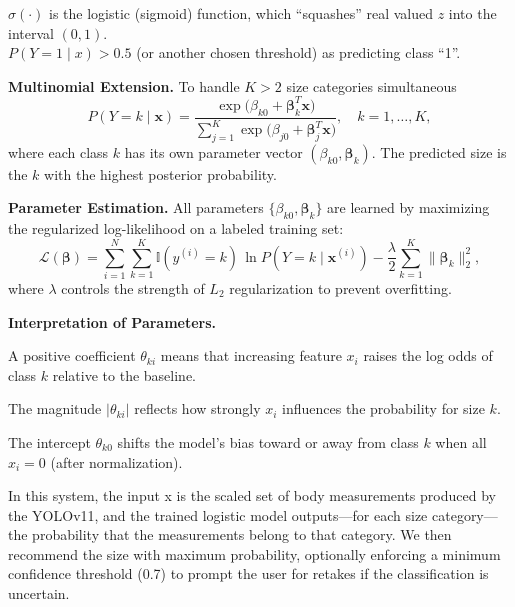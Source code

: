 \documentclass{llncs}
\begin{document}
$\sigma(\cdot)$ is the logistic (sigmoid) function, which ``squashes'' real valued $z$ into the interval $(0,1)$. \\

$P(Y = 1 \mid x) > 0.5$ (or another chosen threshold) as predicting class ``1''.


\textbf{Multinomial Extension.} To handle $K>2$ size categories simultaneous
\begin{equation}
P(Y=k \mid \mathbf{x}) = \frac{\exp\big(\beta_{k0} + \boldsymbol{\beta}_{k}^{T}\mathbf{x}\big)}{\displaystyle\sum_{j=1}^{K}\exp\big(\beta_{j0} + \boldsymbol{\beta}_{j}^{T}\mathbf{x}\big)}, \quad k = 1,\ldots,K,
\end{equation}
where each class $k$ has its own parameter vector $(\beta_{k0}, \boldsymbol{\beta}_{k})$. The predicted size is the $k$ with the highest posterior probability.

\textbf{Parameter Estimation.} All parameters $\{\beta_{k0},\boldsymbol{\beta}_{k}\}$ are learned by maximizing the regularized log-likelihood on a labeled training set:
\begin{equation}
\mathcal{L}(\boldsymbol{\beta}) = \sum_{i=1}^{N}\sum_{k=1}^{K} \mathbb{I}(y^{(i)}=k)\,\ln P(Y=k\mid \mathbf{x}^{(i)}) - \frac{\lambda}{2}\sum_{k=1}^{K}\|\boldsymbol{\beta}_{k}\|_{2}^{2},
\end{equation}
where $\lambda$ controls the strength of $L_{2}$ regularization to prevent overfitting.

\textbf{Interpretation of Parameters.}

\hspace*{2em} A positive coefficient $\theta_{ki}$ means that increasing feature $x_i$ raises the log odds of class $k$ relative to the baseline. 

\hspace*{2em} The magnitude $|\theta_{ki}|$ reflects how strongly $x_i$ influences the probability for size $k$. 

\hspace*{2em} The intercept $\theta_{k0}$ shifts the model’s bias toward or away from class $k$ when all $x_i = 0$ (after normalization).


In this system, the input x is the scaled set of body measurements produced by the YOLOv11, and the trained logistic model outputs—for each 
    size category—the probability that the measurements belong to that category. We then recommend the size with maximum probability, 
    optionally enforcing a minimum confidence threshold (0.7) to prompt the user for retakes if the classification is uncertain.
\end{document}
